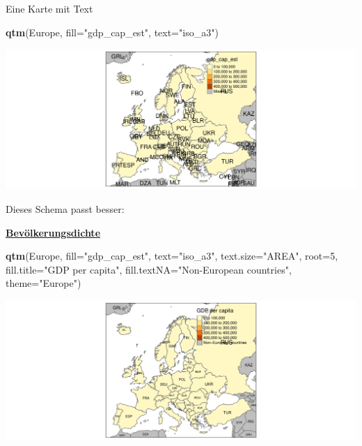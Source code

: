 \documentclass[ignorenonframetext,]{beamer}
\newenvironment{Shaded}{\begin{snugshade}}{\end{snugshade}}
\newcommand{\KeywordTok}[1]{\textcolor[rgb]{0.13,0.29,0.53}{\textbf{#1}}}
\newcommand{\DataTypeTok}[1]{\textcolor[rgb]{0.13,0.29,0.53}{#1}}
\newcommand{\DecValTok}[1]{\textcolor[rgb]{0.00,0.00,0.81}{#1}}
\newcommand{\StringTok}[1]{\textcolor[rgb]{0.31,0.60,0.02}{#1}}
\newcommand{\NormalTok}[1]{#1}
\begin{document}
\begin{frame}[fragile]{Eine Karte mit Text}

\begin{Shaded}
\begin{Highlighting}[]
\KeywordTok{qtm}\NormalTok{(Europe, }\DataTypeTok{fill=}\StringTok{"gdp_cap_est"}\NormalTok{, }\DataTypeTok{text=}\StringTok{"iso_a3"}\NormalTok{)}
\end{Highlighting}
\end{Shaded}

\includegraphics{tmap_files/figure-beamer/unnamed-chunk-9-1.pdf}

\end{frame}

\begin{frame}[fragile]{Dieses Schema passt besser:}

\begin{block}{\href{https://en.wikipedia.org/wiki/Population_density}{\textbf{Bevölkerungsdichte}}}

\begin{Shaded}
\begin{Highlighting}[]
\KeywordTok{qtm}\NormalTok{(Europe, }\DataTypeTok{fill=}\StringTok{"gdp_cap_est"}\NormalTok{, }\DataTypeTok{text=}\StringTok{"iso_a3"}\NormalTok{, }
    \DataTypeTok{text.size=}\StringTok{"AREA"}\NormalTok{, }\DataTypeTok{root=}\DecValTok{5}\NormalTok{, }\DataTypeTok{fill.title=}\StringTok{"GDP per capita"}\NormalTok{, }
    \DataTypeTok{fill.textNA=}\StringTok{"Non-European countries"}\NormalTok{, }\DataTypeTok{theme=}\StringTok{"Europe"}\NormalTok{)}
\end{Highlighting}
\end{Shaded}

\includegraphics{tmap_files/figure-beamer/unnamed-chunk-10-1.pdf}

\end{block}

\end{frame}
\end{document}
